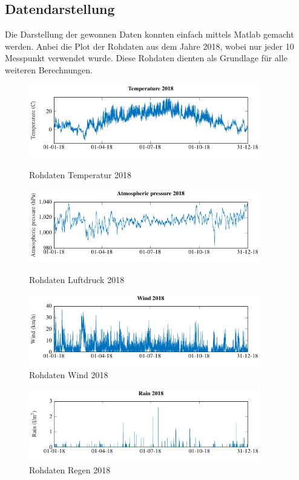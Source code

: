 \begin{refsection}
\newpage

\subsection{Datendarstellung}
Die Darstellung der gewonnen Daten konnten einfach mittels Matlab gemacht werden.
Anbei die Plot der Rohdaten aus dem Jahre 2018, wobei nur jeder 10 Messpunkt verwendet wurde.
Diese Rohdaten dienten als Grundlage für alle weiteren Berechnungen. 
\begin{figure}[h]
	\centering
	\includegraphics[width=0.9\textwidth]{papers/wwt/images/raw_temp_wwt.pdf}
	\caption{Rohdaten Temperatur 2018}
	\label{fig:rawdata_temp_airp}
	\includegraphics[width=0.9\textwidth]{papers/wwt/images/raw_airp_wwt.pdf}
	\caption{Rohdaten Luftdruck 2018}
	\label{fig:rawdata_temp_airp}
	\includegraphics[width=0.9\textwidth]{papers/wwt/images/raw_wind_wwt.pdf}
	\caption{Rohdaten Wind 2018}
	\label{fig:rawdata_temp_airp}
\end{figure}
\begin{figure}[h]
	\centering
	
	\includegraphics[width=0.9\textwidth]{papers/wwt/images/raw_rain_wwt.pdf}
	\caption{Rohdaten Regen 2018}
	\label{fig:rawdata_wind_rain}
\end{figure}


\end{refsection}
